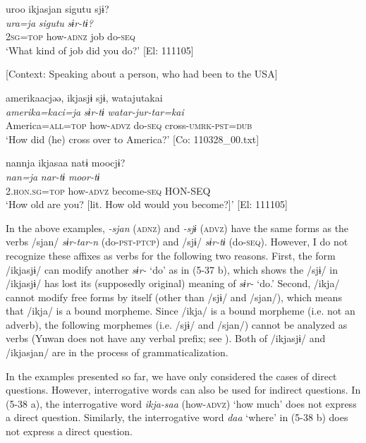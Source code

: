 \ea \label{ex:5:37}  \ea \label{ex:5:a} %
\glll  uroo  ikjasjan  sigutu  sjɨ?\\
\textit{ura=ja}  \textit{}  \textit{sigutu}  \textit{sɨr-tɨ?}\\
2\textsc{sg}=\textsc{top}  how-\textsc{adnz}  job  do-\textsc{seq}\\
\glt ‘What kind of job did you do?’ [El: 111105]

 \ex \label{ex:5:b} [Context: Speaking about a person, who had been to the USA]

\glll  {\textbar}amerika{\textbar}acjəə,  ikjasjɨ  sjɨ,  watajutakai\\
\textit{amerika=kaci=ja}  \textit{}  \textit{sɨr-tɨ}  \textit{watar-jur-tar=kai}\\
America=\textsc{all}=\textsc{top}  how-\textsc{advz}  do-\textsc{seq}  cross-\textsc{umrk}-\textsc{pst}=\textsc{dub}\\
\glt ‘How did (he) cross over to America?’ [Co: 110328\_00.txt]

 \ex \label{ex:5:c} %
\glll  nannja  ikjasaa  natɨ  moocjɨ?\\
\textit{nan=ja}  \textit{}  \textit{nar-tɨ}  \textit{moor-tɨ}\\
2.\textsc{hon}.\textsc{sg}=\textsc{top}  how-\textsc{advz}  become-\textsc{seq}  HON-SEQ\\
\glt ‘How old are you? [lit. How old would you become?]’ [El: 111105]
\z
\z

In the above examples, \textit{{}-sjan} (\textsc{adnz}) and \textit{{}-sjɨ} (\textsc{advz}) have the same forms as the verbs /sjan/ \textit{sɨr-tar-n} (do-\textsc{pst}-\textsc{ptcp}) and /sjɨ/ \textit{sɨr-tɨ} (do-\textsc{seq}). However, I do not recognize these affixes as verbs for the following two reasons. First, the form /ikjasjɨ/ can modify another \textit{sɨr-} ‘do’ as in (5-37 b), which shows the /sjɨ/ in /ikjasjɨ/ has lost its (supposedly original) meaning of \textit{sɨr-} ‘do.’ Second, /ikja/ cannot modify free forms by itself (other than /sjɨ/ and /sjan/), which means that /ikja/ is a bound morpheme. Since /ikja/ is a bound morpheme (i.e. not an adverb), the following morphemes (i.e. /sjɨ/ and /sjan/) cannot be analyzed as verbs (Yuwan does not have any verbal prefix; see ). Both of /ikjasjɨ/ and /ikjasjan/ are in the process of grammaticalization.

In the examples presented so far, we have only considered the cases of direct questions. However, interrogative words can also be used for indirect questions. In (5-38 a), the interrogative word \textit{ikja-saa} (how-\textsc{advz}) ‘how much’ does not express a direct question. Similarly, the interrogative word \textit{daa} ‘where’ in (5-38 b) does not express a direct question.

